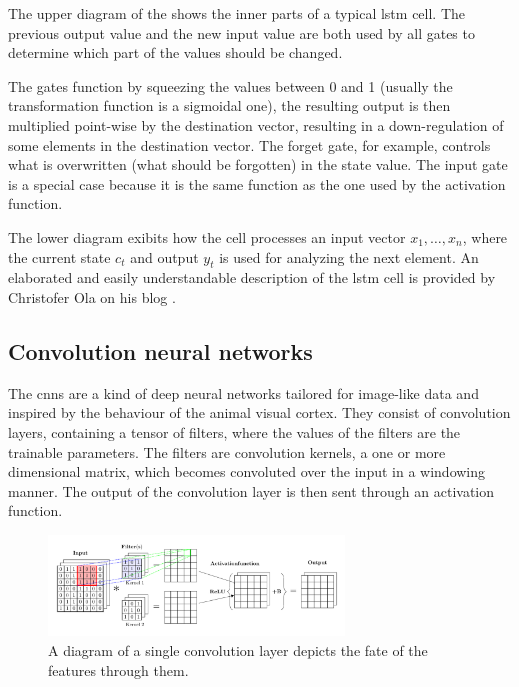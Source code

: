 The upper diagram of the  shows the inner parts of a typical \gls{lstm} cell. The previous output value and the new input value are both used by all gates to determine which part of the values should be changed.

The gates function by squeezing the values between 0 and 1 (usually the transformation function is a sigmoidal one), the resulting output is then multiplied point-wise by the destination vector, resulting in a down-regulation of some elements in the destination vector. The forget gate, for example, controls what is overwritten (what should be forgotten) in the state value. The input gate is a special case because it is the same function as the one used by the activation function.

The lower diagram exibits how the cell processes an input vector $x_1,\hdots,x_n$, where the current state $c_t$ and output $y_t$ is used for analyzing the next element. An elaborated and easily understandable description of the \gls{lstm} cell is provided by Christofer Ola on his blog \cite{Olah2015}.

\subsection{Convolution neural networks}
The \glspl{cnn} are a kind of deep neural networks tailored for image-like data and inspired by the behaviour of the animal visual cortex. They consist of convolution layers, containing a tensor of filters, where the values of the filters are the trainable parameters.
The filters are convolution kernels, a one or more dimensional matrix, which becomes convoluted over the input in a windowing manner.
The output of the convolution layer is then sent through an activation function.
\begin{figure}[H]
\centering
  \includegraphics[width=0.7\textwidth]{image/cnn_schema.pdf}
  \caption{A diagram of a single convolution layer depicts the fate of the features through them.}
  \label{fig:cnn_schema}
\end{figure}

